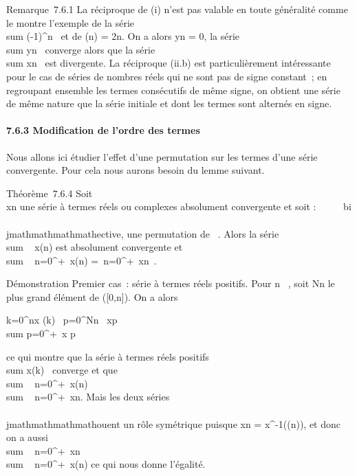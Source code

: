 Remarque~7.6.1 La réciproque de (i) n'est pas valable en toute
généralité comme le montre l'exemple de la série
\\sum  (-1)^n~
et de \phi(n) = 2n. On a alors yn = 0, la série
\\sum  yn~
converge alors que la série
\\sum  xn~ est
divergente. La réciproque (ii.b) est particulièrement intéressante pour
le cas de séries de nombres réels qui ne sont pas de signe constant~; en
regroupant ensemble les termes consécutifs de même signe, on obtient une
série de même nature que la série initiale et dont les termes sont
alternés en signe.

\paragraph{7.6.3 Modification de l'ordre des termes}

Nous allons ici étudier l'effet d'une permutation sur les termes d'une
série convergente. Pour cela nous aurons besoin du lemme suivant.

Théorème~7.6.4 Soit \\\sum
 xn une série à termes réels ou complexes absolument
convergente et soit \sigma : ~ \rightarrow~ ~ bi\\\\jmathmathmathmathective, une permutation de ~. Alors la
série \\sum ~
x\sigma(n) est absolument convergente et
\\sum ~
n=0^+\infty~x\sigma(n) =\
\sum  n=0^+\infty~xn~.

Démonstration Premier cas~: série à termes réels positifs. Pour n \in {}~,
soit Nn le plus grand élément de \sigma({[}0,n{]}). On a alors

\sum k=0^nx \sigma(k)~
\leq\sum p=0^Nn~
xp \leq\\sum
p=0^+\infty~x p

ce qui montre que la série à termes réels positifs
\\sum  x\sigma(k)~
converge et que \\sum ~
n=0^+\infty~x\sigma(n)
\leq\\sum ~
n=0^+\infty~xn. Mais les deux séries \\\\jmathmathmathmathouent un rôle
symétrique puisque xn = x\sigma^-1(\sigma(n)), et
donc on a aussi \\sum ~
n=0^+\infty~xn
\leq\\sum ~
n=0^+\infty~x\sigma(n) ce qui nous donne l'égalité.

